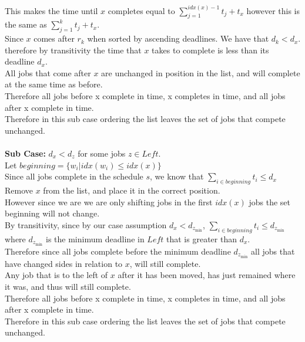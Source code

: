 \documentclass{article}
\begin{document}
        \indent This makes the time until $x$ completes equal to $\sum_{j = 1}^{idx(x) - 1} t_{j} + t_{x}$ however this is the same as $\sum_{j = 1}^{k} t_{j} + t_{x}$. \\
        \indent Since $x$ comes after $r_{k}$ when sorted by ascending deadlines. We have that $d_{k} < d_{x}$. \\
        \indent therefore by transitivity the time that $x$ takes to complete is less than its deadline $d_{x}$. \\
        \indent All jobs that come after $x$ are unchanged in position in the list, and will complete at the same time as before. \\
        \indent Therefore all jobs before x complete in time, x completes in time, and all jobs after x complete in time. \\
        \indent Therefore in this sub case ordering the list leaves the set of jobs that compete unchanged. \\
        \\
        \textbf{Sub Case:} $d_{x} < d_{z}$ for some jobs $z \in Left$. \\
        \indent Let $beginning = \{w_{i} | idx(w_{i}) \leq idx(x)\}$ \\
        \indent Since all jobs complete in the schedule $s$, we know that $\sum_{i \in beginning} t_{i} \leq d_{x}$
        \indent Remove $x$ from the list, and place it in the correct position. \\
        \indent However since we are we are only shifting jobs in the first $idx(x)$ jobs the set beginning will not change. \\
        \indent By transitivity, since by our case assumption $d_{x} < d_{z_{\min}}$, $\sum_{i \in beginning} t_{i} \leq d_{z_{\min}}$ where $d_{z_{\min}}$ is the minimum deadline in $Left$ that is greater than $d_{x}$. \\
        \indent Therefore since all jobs complete before the minimum deadline $d_{z_{\min}}$ all jobs that have changed sides in relation to $x$, will still complete. \\
        \indent Any job that is to the left of $x$ after it has been moved, has just remained where it was, and thus will still complete. \\
        \indent Therefore all jobs before x complete in time, x completes in time, and all jobs after x complete in time. \\
        \indent Therefore in this sub case ordering the list leaves the set of jobs that compete unchanged. \\
\end{document}

